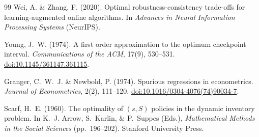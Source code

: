 \documentclass[11pt]{article}
\theoremstyle{definition}
\theoremstyle{remark}
\begin{document}
\begin{thebibliography}{99}
Wei, A. \& Zhang, F. (2020).
Optimal robustness-consistency trade-offs for learning-augmented online algorithms.
In \emph{Advances in Neural Information Processing Systems} (NeurIPS).

Young, J.~W. (1974).
A first order approximation to the optimum checkpoint interval.
\emph{Communications of the ACM}, 17(9), 530--531.
\href{https://doi.org/10.1145/361147.361115}{doi:10.1145/361147.361115}.

Granger, C.~W.~J. \& Newbold, P. (1974).
Spurious regressions in econometrics.
\emph{Journal of Econometrics}, 2(2), 111--120.
\href{https://doi.org/10.1016/0304-4076(74)90034-7}{doi:10.1016/0304-4076(74)90034-7}.

Scarf, H.~E. (1960).
The optimality of $(s,S)$ policies in the dynamic inventory problem.
In K.~J. Arrow, S.~Karlin, \& P.~Suppes (Eds.),
\emph{Mathematical Methods in the Social Sciences} (pp.\ 196--202).
Stanford University Press.

\end{thebibliography}
\end{document}

